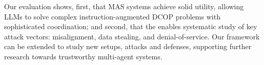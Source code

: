 Our evaluation shows, first, that MAS systems achieve solid utility, allowing LLMs to solve complex instruction-augmented DCOP problems with sophisticated coordination; and second, that the \sys enables systematic study of key attack vectors: misalignment, data stealing, and denial-of-service. Our framework can be extended to study new setups, attacks and defenses, supporting further research towards trustworthy multi-agent systems. 




